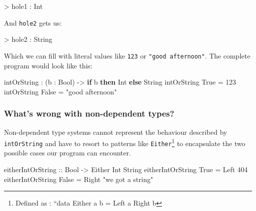 \documentclass[
]{article}
\newenvironment{Shaded}{}{}
\newcommand{\DataTypeTok}[1]{\textcolor[rgb]{0.56,0.13,0.00}{#1}}
\newcommand{\DecValTok}[1]{\textcolor[rgb]{0.25,0.63,0.44}{#1}}
\newcommand{\KeywordTok}[1]{\textcolor[rgb]{0.00,0.44,0.13}{\textbf{#1}}}
\newcommand{\NormalTok}[1]{#1}
\newcommand{\OperatorTok}[1]{\textcolor[rgb]{0.40,0.40,0.40}{#1}}
\newcommand{\OtherTok}[1]{\textcolor[rgb]{0.00,0.44,0.13}{#1}}
\newcommand{\StringTok}[1]{\textcolor[rgb]{0.25,0.44,0.63}{#1}}
\begin{document}
\begin{Shaded}
\begin{Highlighting}[]
\OperatorTok{\textgreater{}}\NormalTok{ hole1 }\OperatorTok{:} \DataTypeTok{Int}
\end{Highlighting}
\end{Shaded}

And \texttt{hole2} gets us:

\begin{Shaded}
\begin{Highlighting}[]
\OperatorTok{\textgreater{}}\NormalTok{ hole2 }\OperatorTok{:} \DataTypeTok{String}
\end{Highlighting}
\end{Shaded}

Which we can fill with literal values like \texttt{123} or
\texttt{"good\ afternoon"}. The complete program would look like this:

\begin{Shaded}
\begin{Highlighting}[]
\NormalTok{intOrString }\OperatorTok{:}\NormalTok{ (b }\OperatorTok{:} \DataTypeTok{Bool}\NormalTok{) }\OtherTok{{-}\textgreater{}} \KeywordTok{if}\NormalTok{ b }\KeywordTok{then} \DataTypeTok{Int} \KeywordTok{else} \DataTypeTok{String}
\NormalTok{intOrString }\DataTypeTok{True} \OtherTok{=} \DecValTok{123}
\NormalTok{intOrString }\DataTypeTok{False} \OtherTok{=} \StringTok{"good afternoon"}
\end{Highlighting}
\end{Shaded}

\hypertarget{whats-wrong-with-non-dependent-types}{%
\subsubsection{What's wrong with non-dependent
types?}\label{whats-wrong-with-non-dependent-types}}

Non-dependent type systems cannot represent the behaviour described by
\texttt{intOrString} and have to resort to patterns like
\texttt{Either}\footnote{Defined as : ``data Either a b = Left a
  \textbar{} Right b} to encapsulate the two possible cases our program
can encounter.

\begin{Shaded}
\begin{Highlighting}[]
\OtherTok{eitherIntOrString ::} \DataTypeTok{Bool} \OtherTok{{-}\textgreater{}} \DataTypeTok{Either} \DataTypeTok{Int} \DataTypeTok{String}
\NormalTok{eitherIntOrString }\DataTypeTok{True} \OtherTok{=} \DataTypeTok{Left} \DecValTok{404}
\NormalTok{eitherIntOrString }\DataTypeTok{False} \OtherTok{=} \DataTypeTok{Right} \StringTok{"we got a string"}
\end{Highlighting}
\end{Shaded}
\end{document}
